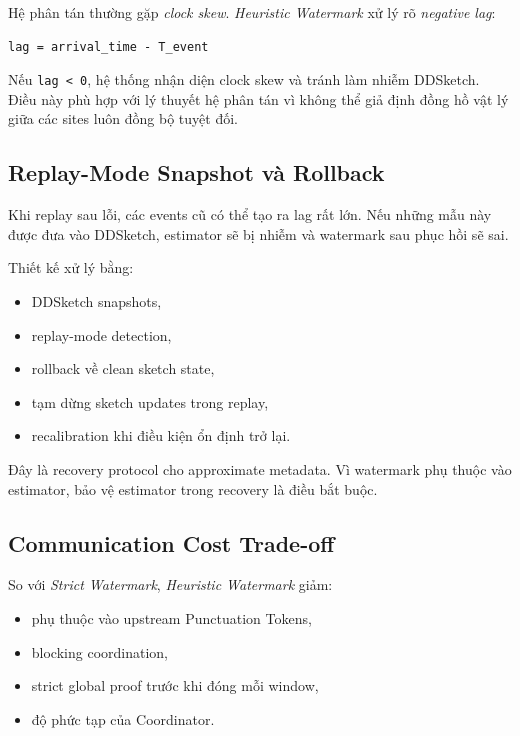 \documentclass[12pt,a4paper]{article}
\begin{document}
Hệ phân tán thường gặp \textit{clock skew}. \textit{Heuristic Watermark} xử lý rõ \textit{negative lag}:

\begin{lstlisting}
lag = arrival_time - T_event
\end{lstlisting}

Nếu \texttt{lag < 0}, hệ thống nhận diện clock skew và tránh làm nhiễm DDSketch. Điều này phù hợp với lý thuyết hệ phân tán vì không thể giả định đồng hồ vật lý giữa các sites luôn đồng bộ tuyệt đối.

\subsection{Replay-Mode Snapshot và Rollback}

Khi replay sau lỗi, các events cũ có thể tạo ra lag rất lớn. Nếu những mẫu này được đưa vào DDSketch, estimator sẽ bị nhiễm và watermark sau phục hồi sẽ sai.

Thiết kế xử lý bằng:

\begin{itemize}
    \item DDSketch snapshots,
    \item replay-mode detection,
    \item rollback về clean sketch state,
    \item tạm dừng sketch updates trong replay,
    \item recalibration khi điều kiện ổn định trở lại.
\end{itemize}

Đây là recovery protocol cho approximate metadata. Vì watermark phụ thuộc vào estimator, bảo vệ estimator trong recovery là điều bắt buộc.

\subsection{Communication Cost Trade-off}

So với \textit{Strict Watermark}, \textit{Heuristic Watermark} giảm:

\begin{itemize}
    \item phụ thuộc vào upstream Punctuation Tokens,
    \item blocking coordination,
    \item strict global proof trước khi đóng mỗi window,
    \item độ phức tạp của Coordinator.
\end{itemize}
\end{document}
